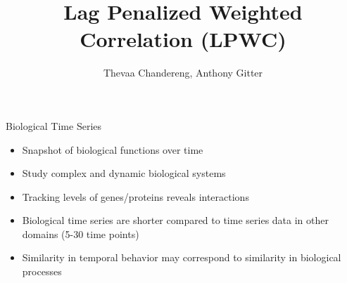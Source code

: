 \documentclass[10pt]{beamer}
\title{Lag Penalized Weighted Correlation (LPWC)}
\date{}
\author{Thevaa Chandereng, Anthony Gitter}
\begin{document}
\maketitle

%
%   


\begin{frame}{Biological Time Series}
    
\begin{itemize}
\item Snapshot of biological functions over time
\item Study complex and dynamic biological systems 
\item Tracking levels of genes/proteins reveals interactions
\item Biological time series are shorter compared to time series data in other domains (5-30 time points)
\item Similarity in temporal behavior may correspond to similarity in biological processes 
 \end{itemize}

\end{frame}
\end{document}
